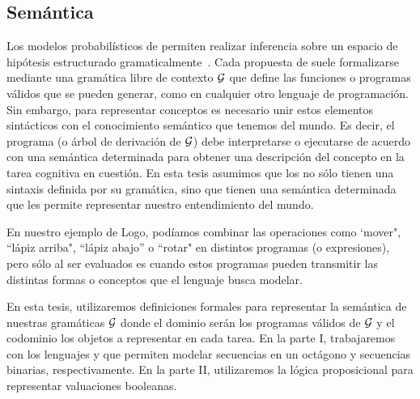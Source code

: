 \subsection{Semántica}

Los modelos probabilísticos de \lot permiten realizar inferencia sobre un espacio de hipótesis estructurado gramaticalmente~\cite{goodman2008rational}. Cada propuesta de \lot suele formalizarse mediante una gramática libre de contexto $ \gram $ que define las funciones o programas válidos que se pueden generar, como en cualquier otro lenguaje de programación. Sin embargo, para representar conceptos es necesario unir estos elementos sintácticos con el conocimiento semántico que tenemos del mundo. Es decir, el programa (o árbol de derivación de $ \gram $) debe interpretarse o ejecutarse de acuerdo con una semántica determinada para obtener una descripción del concepto en la tarea cognitiva en cuestión. En esta tesis asumimos que los \lot no sólo tienen una sintaxis definida por su gramática, sino que tienen una semántica determinada que les permite representar nuestro entendimiento del mundo.

En nuestro ejemplo de Logo, podíamos combinar las operaciones como `mover", ``lápiz arriba", ``lápiz abajo'' o ``rotar" en distintos programas (o expresiones), pero sólo al ser evaluados es cuando estos programas pueden transmitir las distintas formas o conceptos que el lenguaje busca modelar.

En esta tesis, utilizaremos definiciones formales para representar la semántica de nuestras gramáticas $\gram$ donde el dominio serán los programas válidos de $\gram$ y el codominio los objetos a representar en cada tarea. En la parte I, trabajaremos con los lenguajes \gramgeo y \grambin que permiten modelar secuencias en un octágono y secuencias binarias, respectivamente. En la parte II, utilizaremos la lógica proposicional \grambool para representar valuaciones booleanas. 



